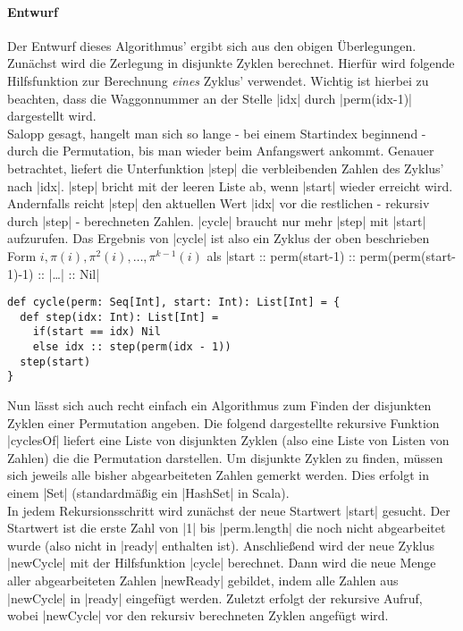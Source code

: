 \paragraph{Entwurf}
\label{slow_cycler}
Der Entwurf dieses Algorithmus' ergibt sich aus den obigen Überlegungen. Zunächst wird die Zerlegung in disjunkte Zyklen berechnet.
Hierfür wird folgende Hilfsfunktion zur Berechnung \emph{eines} Zyklus' verwendet.
Wichtig ist hierbei zu beachten, dass die Waggonnummer an der Stelle |idx| durch |perm(idx-1)| dargestellt wird.\\
Salopp gesagt, hangelt man sich so lange - bei einem Startindex beginnend - durch die Permutation, bis man wieder beim Anfangswert ankommt.
Genauer betrachtet, liefert die Unterfunktion |step| die verbleibenden Zahlen des Zyklus' nach |idx|.
|step| bricht mit der leeren Liste ab, wenn |start| wieder erreicht wird.
Andernfalls reicht |step| den aktuellen Wert |idx| vor die restlichen - rekursiv durch |step| - berechneten Zahlen.
|cycle| braucht nur mehr |step| mit |start| aufzurufen.
Das Ergebnis von |cycle| ist also ein Zyklus der oben beschrieben Form $i, \pi(i), \pi^2(i), \dots, \pi^{k-1}(i)$
als |start :: perm(start-1) :: perm(perm(start-1)-1) :: |\dots| :: Nil|
\lstset{language=Scala}
\lstset{basicstyle=\ttfamily\normalsize}
\begin{lstlisting}
def cycle(perm: Seq[Int], start: Int): List[Int] = {
  def step(idx: Int): List[Int] =
    if(start == idx) Nil
    else idx :: step(perm(idx - 1))
  step(start)
}
\end{lstlisting}
Nun lässt sich auch recht einfach ein Algorithmus zum Finden der disjunkten Zyklen einer Permutation angeben.
Die folgend dargestellte rekursive Funktion |cyclesOf| liefert eine Liste von disjunkten Zyklen (also eine Liste von Listen von Zahlen)
die die Permutation darstellen. Um disjunkte Zyklen zu finden, müssen sich jeweils alle bisher abgearbeiteten Zahlen gemerkt werden.
Dies erfolgt in einem |Set| (standardmäßig ein |HashSet| in Scala). \\
In jedem Rekursionsschritt wird zunächst der neue Startwert |start| gesucht.
Der Startwert ist die erste Zahl von |1| bis |perm.length| die noch nicht abgearbeitet wurde (also nicht in |ready| enthalten ist).
Anschließend wird der neue Zyklus |newCycle| mit der Hilfsfunktion |cycle| berechnet.
Dann wird die neue Menge aller abgearbeiteten Zahlen |newReady| gebildet, indem alle Zahlen aus |newCycle| in |ready| eingefügt werden.
Zuletzt erfolgt der rekursive Aufruf, wobei |newCycle| vor den rekursiv berechneten Zyklen angefügt wird.
